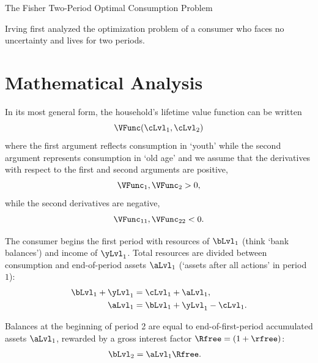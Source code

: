 \documentclass{scrartcl}
\begin{document}
\handoutHeader

{\centerline {\LARGE The Fisher Two-Period Optimal Consumption Problem }}\vspace{0.15in}



  Irving \cite{fisherInterestTheory} first analyzed the optimization
  problem of a consumer who faces no uncertainty and lives for two
  periods.

  \section{Mathematical Analysis}

  In its most general form, the household's lifetime value function can be written
  \[
    \VFunc(\cLvl_{1},\cLvl_{2})
  \]
  where the first argument reflects consumption in `youth' while the second argument represents consumption in `old age' and we assume that the derivatives with respect to the first and second arguments are positive,
  \begin{equation}
    \VFunc_{1}, \VFunc_{2} > 0, \label{eq:uprimepos}
  \end{equation}
  while the second derivatives are negative,
  \begin{equation}
    \VFunc_{11}, \VFunc_{22}<0 \label{eq:uprimeprimeneg}.
  \end{equation}

  The consumer begins the first period with resources of $\bLvl_{1}$ (think `bank balances') and income of $\yLvl_{1}$.
  Total resources are divided between consumption and end-of-period assets $\aLvl_{1}$ (`assets after all actions' in period ${1}$):
  \begin{equation}\begin{gathered}\begin{aligned}
        \bLvl_{1}+\yLvl_{1} & =  \cLvl_{1}+\aLvl_{1},
        \\ \aLvl_{1} & =  \bLvl_{1}+\yLvl_{1}-\cLvl_{1}.
      \end{aligned}\end{gathered}\end{equation}

  Balances at the beginning of period 2 are equal to end-of-first-period accumulated assets $\aLvl_{1}$, rewarded by a gross interest factor $\Rfree = (1+\rfree)$:
  \begin{equation}\begin{gathered}\begin{aligned}
        \bLvl_{2} & =  \aLvl_{1}\Rfree.
      \end{aligned}\end{gathered}\end{equation}
\end{document}
